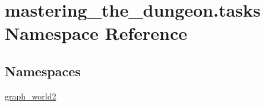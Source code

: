 \hypertarget{namespacemastering__the__dungeon_1_1tasks}{}\section{mastering\+\_\+the\+\_\+dungeon.\+tasks Namespace Reference}
\label{namespacemastering__the__dungeon_1_1tasks}
\subsection*{Namespaces}
\begin{DoxyCompactItemize}
\item 
 \hyperlink{namespacemastering__the__dungeon_1_1tasks_1_1graph__world2}{graph\+\_\+world2}
\end{DoxyCompactItemize}
